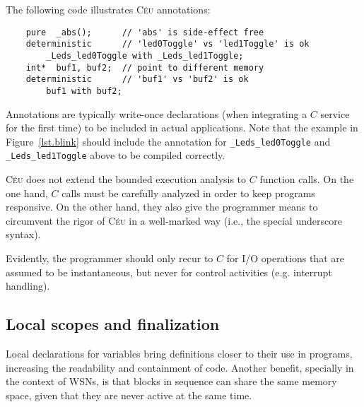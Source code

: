 \documentclass[10pt]{sensys-proc}
\newcommand{\CEU}{\textsc{C\'{e}u}\xspace}
\newcommand{\code}[1] {{\small{\texttt{#1}}}}
\begin{document}
The following code illustrates \CEU annotations:

{\small
\begin{verbatim}
    pure  _abs();      // 'abs' is side-effect free
    deterministic      // 'led0Toggle' vs 'led1Toggle' is ok
        _Leds_led0Toggle with _Leds_led1Toggle;
    int*  buf1, buf2;  // point to different memory
    deterministic      // 'buf1' vs 'buf2' is ok
        buf1 with buf2;
\end{verbatim}
}

Annotations are typically write-once declarations (when integrating a $C$ 
service for the first time) to be included in actual applications.
Note that the example in Figure~\ref{lst.blink} should include the annotation 
for \code{\_Leds\_led0Toggle} and \code{\_Leds\_led1Toggle} above to be 
compiled correctly.

\CEU does not extend the bounded execution analysis to $C$ function calls. 
On the one hand, $C$ calls must be carefully analyzed in order to keep programs 
responsive.
On the other hand, they also give the programmer means to circumvent the rigor 
of \CEU in a well-marked way (i.e., the special underscore syntax).

\begin{comment}
This approach is also adopted by Esterel, which supports the \code{call} 
primitive to execute code assumed to be instantaneous in the host 
language~\cite{esterel.primer}.
In \CEU, we take a step further and statically detects when such calls may 
execute concurrently, as discussed in the next section.
\end{comment}

Evidently, the programmer should only recur to $C$ for I/O operations that are 
assumed to be instantaneous, but never for control activities (e.g. interrupt 
handling).

\subsection{Local scopes and finalization}
\label{sec.ceu.local}

Local declarations for variables bring definitions closer to their use in 
programs, increasing the readability and containment of code.
Another benefit, specially in the context of WSNs, is that blocks in sequence 
can share the same memory space, given that they are never active at the same 
time.
\end{document}
